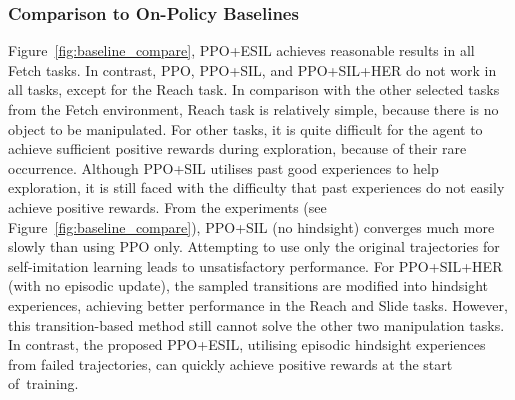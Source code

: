 \subsubsection{Comparison to On-Policy Baselines}
{Figure~\ref{fig:baseline_compare}, PPO+ESIL} achieves reasonable results in all Fetch tasks. {In contrast}, PPO, PPO+SIL, and PPO+SIL+HER do not work in all tasks, except for the Reach task. In comparison with the other selected tasks from the Fetch environment, Reach task is relatively simple, because there is no object to be manipulated. For other tasks, it is quite difficult for the agent to achieve sufficient positive rewards during exploration, because of their rare occurrence. Although PPO+SIL utilises past good experiences to help exploration, it is still faced with the difficulty that past experiences do not easily achieve positive rewards. From the experiments ({see Figure~\ref{fig:baseline_compare}}), PPO+SIL (no hindsight) converges much more slowly than using PPO only. Attempting to use only the original trajectories for self-imitation learning leads to unsatisfactory performance. For PPO+SIL+HER (with no episodic update), the sampled transitions are modified into hindsight experiences, achieving better performance in the Reach and Slide tasks. However, this transition-based method still cannot solve the other two manipulation tasks. In contrast, the proposed PPO+ESIL, utilising episodic hindsight experiences from failed trajectories, can quickly achieve positive rewards at the start of~training.


